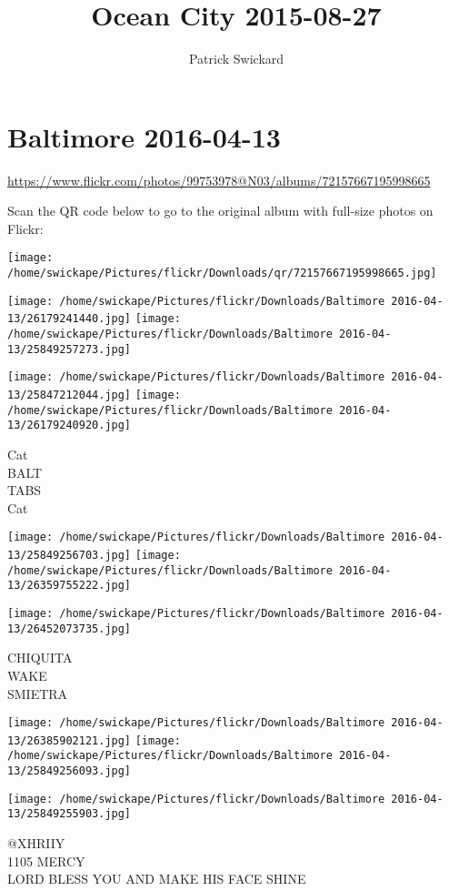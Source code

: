 \documentclass[10pt,letterpaper]{article}
\title{Ocean City 2015-08-27}
\author{Patrick Swickard}
\date{}
\begin{document}
\section*{Baltimore 2016-04-13}

\url{https://www.flickr.com/photos/99753978@N03/albums/72157667195998665}

Scan the QR code below to go to the original album with full-size photos on Flickr:

\texttt{[image: /home/swickape/Pictures/flickr/Downloads/qr/72157667195998665.jpg]}
\pagebreak

\texttt{[image: /home/swickape/Pictures/flickr/Downloads/Baltimore 2016-04-13/26179241440.jpg]}
\texttt{[image: /home/swickape/Pictures/flickr/Downloads/Baltimore 2016-04-13/25849257273.jpg]}

\texttt{[image: /home/swickape/Pictures/flickr/Downloads/Baltimore 2016-04-13/25847212044.jpg]}
\texttt{[image: /home/swickape/Pictures/flickr/Downloads/Baltimore 2016-04-13/26179240920.jpg]}

Cat\\
BALT\\
TABS\\
Cat
\pagebreak

\texttt{[image: /home/swickape/Pictures/flickr/Downloads/Baltimore 2016-04-13/25849256703.jpg]}
\texttt{[image: /home/swickape/Pictures/flickr/Downloads/Baltimore 2016-04-13/26359755222.jpg]}

\vspace{0.25in}
\texttt{[image: /home/swickape/Pictures/flickr/Downloads/Baltimore 2016-04-13/26452073735.jpg]}

CHIQUITA\\
WAKE\\
SMIETRA
\pagebreak

\texttt{[image: /home/swickape/Pictures/flickr/Downloads/Baltimore 2016-04-13/26385902121.jpg]}
\texttt{[image: /home/swickape/Pictures/flickr/Downloads/Baltimore 2016-04-13/25849256093.jpg]}

\texttt{[image: /home/swickape/Pictures/flickr/Downloads/Baltimore 2016-04-13/25849255903.jpg]}

@XHRIIY\\
1105 MERCY\\
LORD BLESS YOU AND MAKE HIS FACE SHINE
\pagebreak
\end{document}
